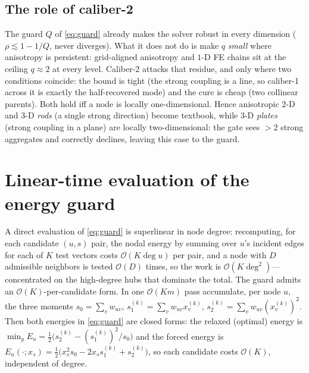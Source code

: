 \documentclass{siamart220329}
\begin{document}
\subsection{The role of caliber-2}
The guard $Q$ of \eqref{eq:guard} already makes the solver robust in every
dimension ($\rho\lesssim1-1/Q$, never diverges). What it does not do is make $q$ \emph{small}
where anisotropy is persistent: grid-aligned anisotropy and $1$-D FE chains sit at the ceiling
$q\approx2$ at every level. Caliber-2 attacks that residue, and only where two conditions
coincide: the bound is tight (the strong coupling is a line, so caliber-1 across it is exactly
the half-recovered mode) and the cure is cheap (two collinear parents). Both hold iff a node is
locally one-dimensional. Hence anisotropic $2$-D and $3$-D \emph{rods} (a single strong
direction) become textbook, while $3$-D \emph{plates} (strong coupling in a plane) are locally
two-dimensional: the gate sees $>2$ strong aggregates and correctly declines, leaving this case to the guard.

\section{Linear-time evaluation of the energy guard}\label{sec:guardeval}
A direct evaluation of \eqref{eq:guard} is superlinear in node degree: recomputing, for each candidate
$(u,s)$ pair, the nodal energy by summing over $u$'s incident edges for each of $K$ test
vectors costs $\mathcal{O}(K\deg u)$ per pair, and a node with $D$ admissible neighbors is
tested $\mathcal{O}(D)$ times, so the work is $\mathcal{O}(K\deg^2)$---concentrated on the
high-degree hubs that dominate the total. The guard admits an $\mathcal{O}(K)$-per-candidate
form. In one $\mathcal{O}(Km)$ pass accumulate, per node $u$, the three moments
$s_0=\sum_v w_{uv}$, $s_1^{(k)}=\sum_v w_{uv}x^{(k)}_v$, $s_2^{(k)}=\sum_v w_{uv}(x^{(k)}_v)^2$.
Then both energies in \eqref{eq:guard} are closed forms: the relaxed (optimal) energy is
$\min_y E_u=\tfrac12\big(s_2^{(k)}-(s_1^{(k)})^2/s_0\big)$ and the forced energy is
$E_u(\cdot;x_s)=\tfrac12\big(x_s^2 s_0-2x_s s_1^{(k)}+s_2^{(k)}\big)$, so each candidate costs
$\mathcal{O}(K)$, independent of degree.
\end{document}
